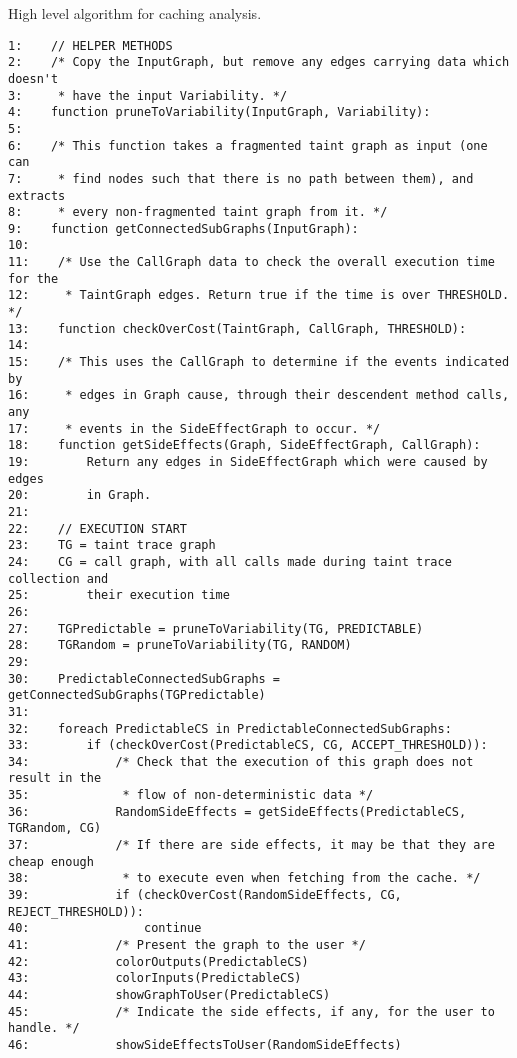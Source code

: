 \documentclass[msc,oneside]{ubcthesis}
\begin{document}
\begin{Program}
  \caption{\label{prog:code2} High level algorithm for caching analysis.}
\begin{verbatim}
1:    // HELPER METHODS
2:    /* Copy the InputGraph, but remove any edges carrying data which doesn't
3:     * have the input Variability. */
4:    function pruneToVariability(InputGraph, Variability):
5:        
6:    /* This function takes a fragmented taint graph as input (one can
7:     * find nodes such that there is no path between them), and extracts
8:     * every non-fragmented taint graph from it. */
9:    function getConnectedSubGraphs(InputGraph):
10:    
11:    /* Use the CallGraph data to check the overall execution time for the
12:     * TaintGraph edges. Return true if the time is over THRESHOLD. */
13:    function checkOverCost(TaintGraph, CallGraph, THRESHOLD):
14:    
15:    /* This uses the CallGraph to determine if the events indicated by
16:     * edges in Graph cause, through their descendent method calls, any 
17:     * events in the SideEffectGraph to occur. */
18:    function getSideEffects(Graph, SideEffectGraph, CallGraph):
19:        Return any edges in SideEffectGraph which were caused by edges
20:        in Graph.
21:    
22:    // EXECUTION START
23:    TG = taint trace graph
24:    CG = call graph, with all calls made during taint trace collection and
25:        their execution time
26:    
27:    TGPredictable = pruneToVariability(TG, PREDICTABLE)
28:    TGRandom = pruneToVariability(TG, RANDOM)
29:    
30:    PredictableConnectedSubGraphs = getConnectedSubGraphs(TGPredictable)
31:    
32:    foreach PredictableCS in PredictableConnectedSubGraphs:
33:        if (checkOverCost(PredictableCS, CG, ACCEPT_THRESHOLD)):
34:            /* Check that the execution of this graph does not result in the
35:             * flow of non-deterministic data */
36:            RandomSideEffects = getSideEffects(PredictableCS, TGRandom, CG)
37:            /* If there are side effects, it may be that they are cheap enough
38:             * to execute even when fetching from the cache. */
39:            if (checkOverCost(RandomSideEffects, CG, REJECT_THRESHOLD)):
40:                continue
41:            /* Present the graph to the user */
42:            colorOutputs(PredictableCS)
43:            colorInputs(PredictableCS)
44:            showGraphToUser(PredictableCS)
45:            /* Indicate the side effects, if any, for the user to handle. */
46:            showSideEffectsToUser(RandomSideEffects)
\end{verbatim}
\end{Program}
\end{document}

